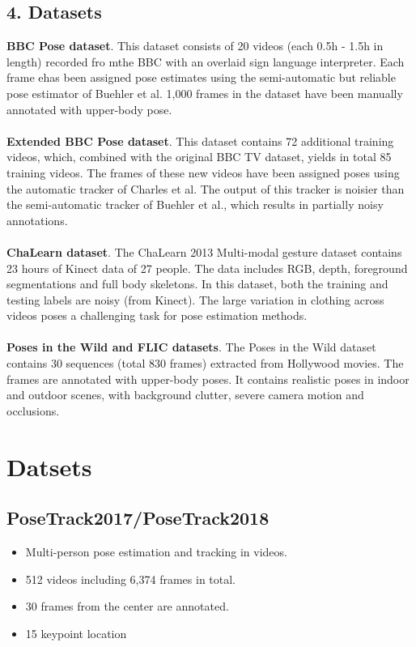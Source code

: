 \documentclass[a4paper]{report}
\begin{document}
\section*{4. Datasets}
\textbf{BBC Pose dataset}. This dataset consists of 20 videos (each 0.5h - 1.5h in length) recorded fro mthe BBC with an overlaid sign language interpreter. Each frame ehas been assigned pose estimates using the semi-automatic but reliable pose estimator of Buehler et al. 1,000 frames in the dataset have been manually annotated with upper-body pose.
\\
\\
\textbf{Extended BBC Pose dataset}. This dataset contains 72 additional training videos, which, combined with the original BBC TV dataset, yields in total 85 training videos. The frames of these new videos have been assigned poses using the automatic tracker of Charles et al. The output of this tracker is noisier than the semi-automatic tracker of Buehler et al., which results in partially noisy annotations.
\\
\\
\textbf{ChaLearn dataset}. The ChaLearn 2013 Multi-modal gesture dataset contains 23 hours of Kinect data of 27 people. The data includes RGB, depth, foreground segmentations and full body skeletons. In this dataset, both the training and testing labels are noisy (from Kinect). The large variation in clothing across videos poses a challenging task for pose estimation methods.
\\
\\
\textbf{Poses in the Wild and FLIC datasets}. The Poses in the Wild dataset contains 30 sequences (total 830 frames) extracted from Hollywood movies. The frames are annotated with upper-body poses. It contains realistic poses in indoor and outdoor scenes, with background clutter, severe camera motion and occlusions.

\chapter*{Datsets}
\section*{PoseTrack2017/PoseTrack2018}
\begin{itemize}
    \item Multi-person pose estimation and tracking in videos.
    \item 512 videos including 6,374 frames in total.
    \item 30 frames from the center are annotated.
    \item 15 keypoint location
\end{itemize}
\end{document}
